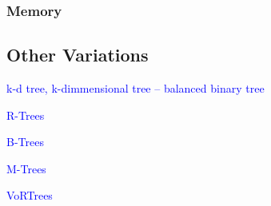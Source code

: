 
\subsubsection{Memory}

\subsection{Other Variations}

\textcolor{blue}{k-d tree, k-dimmensional tree -- balanced binary tree}

\textcolor{blue}{R-Trees}

\textcolor{blue}{B-Trees}

\textcolor{blue}{M-Trees}

\textcolor{blue}{VoRTrees}